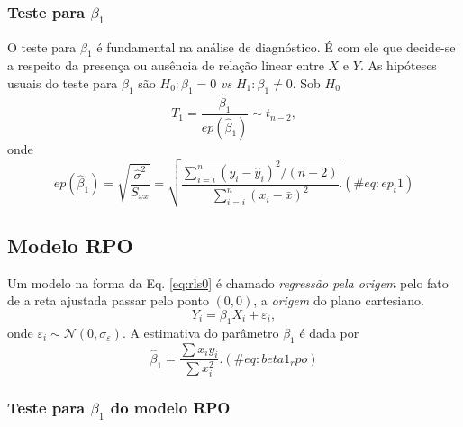 \documentclass[
]{book}
\theoremstyle{definition}
\theoremstyle{definition}
\theoremstyle{definition}
\theoremstyle{remark}
\begin{document}
\hypertarget{teste-para-beta_1}{%
\subsubsection*{\texorpdfstring{Teste para \(\beta_1\)}{Teste para \textbackslash beta\_1}}\label{teste-para-beta_1}}

O teste para \(\beta_1\) é fundamental na análise de diagnóstico. É com ele que decide-se a respeito da presença ou ausência de relação linear entre \(X\) e \(Y\). As hipóteses usuais do teste para \(\beta_1\) são \(H_0: \beta_1 = 0\) \emph{vs} \(H_1: \beta_1 \ne 0\). Sob \(H_0\)
\begin{equation}
T_1 = \frac{\hat{\beta}_1}{ep(\hat{\beta}_1)} \sim t_{n-2},
\label{eq:t1}
\end{equation}
onde
\begin{equation}
ep(\hat{\beta}_1) = \sqrt{\frac{\hat{\sigma}^2}{S_{xx}}} = \sqrt{\frac{\sum_{i=i}^n (y_i - \hat{y}_i)^2 / (n-2)}{\sum_{i=i}^n (x_i - \bar{x})^2} }.
(\#eq:ep_t1)
\end{equation}

\hypertarget{modelo-rpo}{%
\subsection{Modelo RPO}\label{modelo-rpo}}

Um modelo na forma da Eq. \eqref{eq:rls0} é chamado \emph{regressão pela origem} pelo fato de a reta ajustada passar pelo ponto \((0,0)\), a \emph{origem} do plano cartesiano.
\begin{equation}
Y_i = \beta_1 X_i + \varepsilon_i,
\label{eq:rls0}
\end{equation}
onde \(\varepsilon_i \sim \mathcal{N}(0,\sigma_{\varepsilon})\). A estimativa do parâmetro \(\beta_1\) é dada por
\begin{equation}
\hat{\beta}_1 = \frac{\sum{x_i y_i} }{\sum{x_i^2} }.
(\#eq:beta1_rpo)
\end{equation}

\hypertarget{teste-para-beta_1-do-modelo-rpo}{%
\subsubsection*{\texorpdfstring{Teste para \(\beta_1\) do modelo RPO}{Teste para \textbackslash beta\_1 do modelo RPO}}\label{teste-para-beta_1-do-modelo-rpo}}
\end{document}
